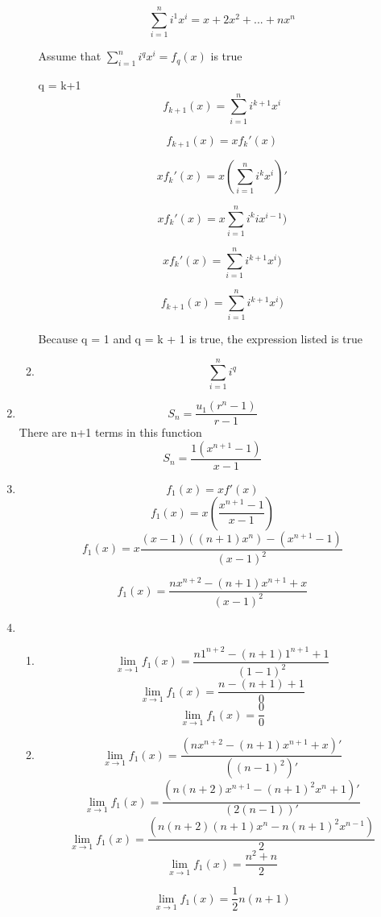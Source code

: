 \documentclass[../main.tex]{subfiles}
\begin{document}
\begin{enumerate}
\begin{enumerate}
                \[ \sum_{i=1}^n i^1 x^i = x + 2 x^2 + ... + n x^n \]

                Assume that $\sum_{i=1}^n i^q x^i = f_q(x)$ is true

                q = k+1
                \[ f_{k+1}(x) = \sum_{i=1}^{n} i^{k+1} x^i \]

                \[ f_{k+1}(x) = x f_k'(x) \]


                \[ x f_k'(x) = x(\sum_{i=1}^n i^k x^i)' \]


                \[ x f_k'(x) = x\sum_{i=1}^n i^{k} ix^{i-1}) \]


                \[ x f_k'(x) = \sum_{i=1}^n i^{k+1} x^{i}) \]


                \[ f_{k+1}(x) = \sum_{i=1}^n i^{k+1} x^{i}) \]

                Because q = 1 and q = k + 1 is true, the expression listed is true

            \item 
                \[ \sum_{i=1}^n i^q \]

                


        \end{enumerate}

    \item 
        \[ S_n = \frac{u_1 (r^n - 1)}{r-1} \]
        There are n+1 terms in this function
        \[ S_n = \frac{1 (x^{n+1} - 1)}{x-1} \]

    \item 
        \[ f_1 (x) = xf'(x) \]
        \[ f_1 (x) = x(\frac{x^{n+1} - 1}{x-1}) \]
        \[ f_1(x) = x\frac{(x-1)((n+1)x^n) - (x^{n+1} - 1)}{(x-1)^2} \] 

        \[ f_1(x) = \frac{nx^{n+2} - (n+1)x^{n+1} + x}{(x-1)^2} \]
    \item
        \begin{enumerate}
            \item
                \[ \lim_{x \to 1} f_1(x) = \frac{n1^{n+2} - (n+1)1^{n+1} + 1}{(1-1)^2} \]
                \[ \lim_{x \to 1} f_1(x) = \frac{n - (n+1) + 1}{0} \]
                \[ \lim_{x \to 1} f_1(x) = \frac{0}{0} \]
            \item
                \[ \lim_{x \to 1} f_1(x) = \frac{(nx^{n+2} - (n+1)x^{n+1} + x)'}{((n-1)^2)'} \]
                \[ \lim_{x \to 1} f_1(x) = \frac{(n(n+2)x^{n+1} - (n+1)^2x^{n} + 1)'}{(2(n-1))'} \]
                \[ \lim_{x \to 1} f_1(x) = \frac{(n(n+2)(n+1)x^{n} - n(n+1)^2x^{n-1})}{2} \]
                \[ \lim_{x \to 1} f_1(x) = \frac{n^2 + n}{2} \]

                \[ \lim_{x \to 1} f_1(x) = \frac{1}{2} n(n + 1) \]




        \end{enumerate}
        
\end{enumerate}
\end{document}
